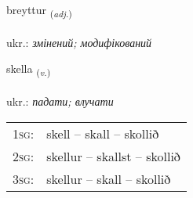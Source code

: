 \documentclass[frontgrid, backgrid]{flacards}\usepackage[]{graphicx}\usepackage[]{xcolor}
\begin{document}
\renewcommand{\flhead}{\vskip5pt \fboxsep=0pt {\small\bfseries\footnotesize Lýsingarorð | прикметник}}
\renewcommand{\fcfoot}{\vskip5pt \fboxsep=0pt \hspace{2pt}{\small\bfseries\footnotesize 2K}}

\renewcommand{\blhead}{\vskip5pt {\small\bfseries\footnotesize Lýsingarorð | прикметник }}
\renewcommand{\bcfoot}{\vskip5pt \hspace{2pt}{\small\bfseries\footnotesize 2K}}


{breyttur \small{\textsubscript{(\textit{adj.})}} \\[1ex] %
\textphonetic{[preihtʏr]} \\
ukr.: \emph{змінений; модифікований} \\  [2ex]
\renewcommand*{\arraystretch}{0.8}
}

\renewcommand{\flhead}{\vskip5pt \fboxsep=0pt {\small\bfseries\footnotesize Sagnorð | дієслово}}
\renewcommand{\fcfoot}{\vskip5pt \fboxsep=0pt \hspace{2pt}{\small\bfseries\footnotesize 2K}}

\renewcommand{\blhead}{\vskip5pt {\small\bfseries\footnotesize Sagnorð | дієслово }}
\renewcommand{\bcfoot}{\vskip5pt \hspace{2pt}{\small\bfseries\footnotesize 2K}}


{skella \small{\textsubscript{(\textit{v.})}} \\[1ex] %
\textphonetic{[scɛtla]} \\
ukr.: \emph{падати; влучати} \\  [2ex]
\renewcommand*{\arraystretch}{0.8}
\begin{tabular}{p{1cm}l}
\textsc{1sg}: & skell -- skall -- skollið \\ 
\textsc{2sg}: & skellur -- skallst -- skollið \\ 
\textsc{3sg}: & skellur -- skall -- skollið \\ 
\end{tabular}
}
\end{document}
